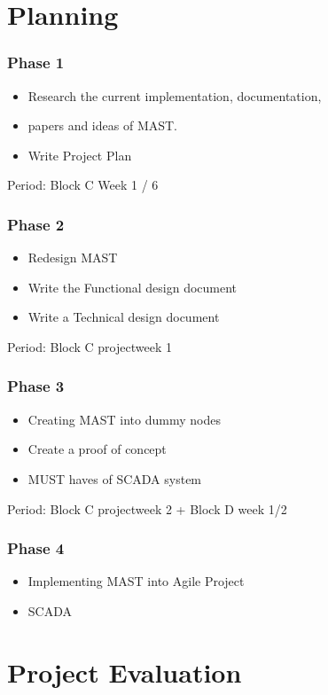 \documentclass[12pt,a4paper]{report}
\begin{document}
\newpage
\section{Planning}
\subsubsection{Phase 1}
\begin{itemize}
\item Research the current implementation, documentation, \item papers and ideas of MAST.
\item Write Project Plan
\end{itemize}
Period: Block C Week 1 / 6

\subsubsection{Phase 2}
\begin{itemize}
\item Redesign MAST
\item Write the Functional design document
\item Write a Technical design document
\end{itemize}
Period: Block C projectweek 1

\subsubsection{Phase 3}
\begin{itemize}
\item Creating MAST into dummy nodes
\item Create a proof of concept
\item MUST haves of SCADA system
\end{itemize}
Period: Block C projectweek 2 + Block D week 1/2

\subsubsection{Phase 4}
\begin{itemize}
\item Implementing MAST into Agile Project
\item SCADA
\end{itemize}

\newpage
\section{Project Evaluation}
\end{document}
